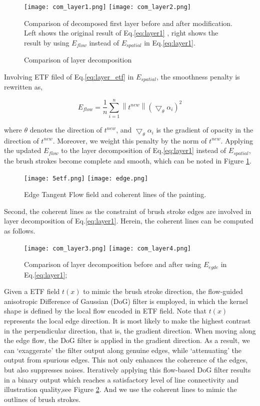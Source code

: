 \begin{figure}[H]
	\centering
	\texttt{[image: com\_layer1.png]}
	\texttt{[image: com\_layer2.png]}
	\caption{Comparison of layer decomposition  }
	\label{com eflow}
	\medskip
	\small
	Comparison of decomposed first layer before and after modification. Left shows the original result of Eq.\ref{eq:layer1} , right shows the result by using $E_{flow}$ instead of $E_{spatial}$ in Eq.\ref{eq:layer1}.
\end{figure}

Involving ETF filed of Eq.\ref{eq:layer_etf} in $E_{spatial}$, the smoothness penalty is rewritten as,

\begin{equation} 
E_{flow}=\frac{1}{n} \sum_{i=1}^{n} \left \| t^{new} \right \| \left ( \bigtriangledown_{\theta}\alpha_{i} \right )^2 
\end{equation} 

where $\theta$ denotes the direction of $t^{new}$, and $ \bigtriangledown_{\theta}\alpha_{i} $ is the gradient of opacity in the direction of $t^{new}$. Moreover, we weight this penalty by the norm of $t^{new}$. Applying the updated $E_{flow}$ to the layer decomposition of Eq.\ref{eq:layer1} instead of $E_{spatial}$, the brush strokes become complete and smooth, which can be noted in Figure \ref{com eflow}.

\begin{figure}[H]
	\centering
	\texttt{[image: 5etf.png]}
	\texttt{[image: edge.png]}
	\caption{Edge Tangent Flow field and coherent lines of the painting.}
	\label{etfline}
\end{figure}


Second, the coherent lines as the constraint of brush stroke edges are involved in layer decomposition of Eq.\ref{eq:layer1}. Herein, the coherent lines can be computed as follows.
\begin{figure}[H]
	\centering
	\texttt{[image: com\_layer3.png]}
	\texttt{[image: com\_layer4.png]}
	\caption{Comparison of layer decomposition before and after using $E_{egde}$  in Eq.\ref{eq:layer1}; }
	\label{com:edge}
\end{figure}
Given a ETF field $t(x)$ to mimic the brush stroke direction, the flow-guided anisotropic Difference of Gaussian (DoG) filter is employed, in which the kernel shape is defined by the local flow encoded in ETF field. Note that $t(x)$ represents the local edge direction. It is most likely to make the highest contrast in the perpendicular direction, that is, the gradient direction. When moving along the edge flow, the DoG filter is applied in the gradient direction. As a result, we can ‘exaggerate’ the filter output along genuine edges, while ‘attenuating’ the output from spurious edges. This not only enhances the coherence of the edges, but also suppresses noises. Iteratively applying this flow-based DoG filter results in a binary output which reaches a satisfactory level of line connectivity and illustration quality,see Figure \ref{etfline}. And we use the coherent lines to mimic the outlines of brush strokes.

